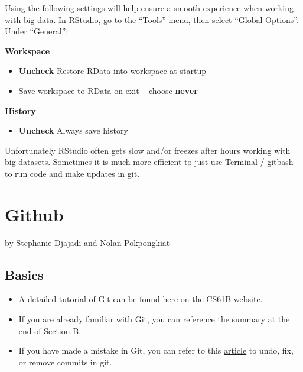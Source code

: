 \documentclass[]{book}
\providecommand{\tightlist}{%
  \setlength{\itemsep}{0pt}\setlength{\parskip}{0pt}}
\begin{document}
Using the following settings will help ensure a smooth experience when
working with big data. In RStudio, go to the ``Tools'' menu, then select
``Global Options''. Under ``General'':

\textbf{Workspace}

\begin{itemize}
\tightlist
\item
  \textbf{Uncheck} Restore RData into workspace at startup
\item
  Save workspace to RData on exit -- choose \textbf{never}
\end{itemize}

\textbf{History}

\begin{itemize}
\tightlist
\item
  \textbf{Uncheck} Always save history
\end{itemize}

Unfortunately RStudio often gets slow and/or freezes after hours working
with big datasets. Sometimes it is much more efficient to just use
Terminal / gitbash to run code and make updates in git.

\chapter{Github}\label{github}

by Stephanie Djajadi and Nolan Pokpongkiat

\section{Basics}\label{basics}

\begin{itemize}
\tightlist
\item
  A detailed tutorial of Git can be found
  \href{https://sp19.datastructur.es/materials/guides/using-git\#b-local-repositories-narrative-introduction}{here
  on the CS61B website}.
\item
  If you are already familiar with Git, you can reference the summary at
  the end of
  \href{https://sp19.datastructur.es/materials/guides/using-git\#b-local-repositories-narrative-introduction}{Section
  B}.
\item
  If you have made a mistake in Git, you can refer to this
  \href{https://sethrobertson.github.io/GitFixUm/fixup.html}{article} to
  undo, fix, or remove commits in git.
\end{itemize}
\end{document}
